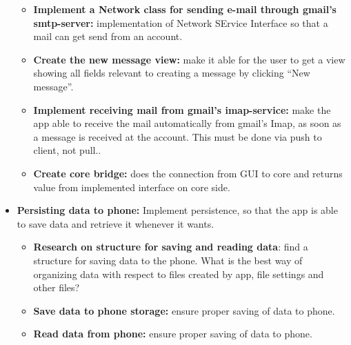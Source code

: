 \begin{itemize}
\begin{itemize}
\item{}\textbf{Implement a Network class for sending e-mail through gmail’s smtp-server:} implementation of Network SErvice Interface so that a mail can get send from an account.
\item{}\textbf{Create the new message view:} make it able for the user to get a view showing all fields relevant to creating a message by clicking “New message”.
\item{}\textbf{Implement receiving mail from gmail’s imap-service:} make the app able to receive the mail automatically from gmail’s Imap, as soon as a message is received at the account. This must be done via push to client, not pull..
\item{}\textbf{Create core bridge:} does the connection from GUI to core and returns value from implemented interface on core side.
\end{itemize}
\item{}\textbf{Persisting data to phone:} Implement persistence, so that the app is able to save data and retrieve it whenever it wants.
\begin{itemize}
\item{}\textbf{Research on structure for saving and reading data}: find a structure for saving data to the phone. What is the best way of organizing data with respect to files created by app, file settings and other files?
\item{}\textbf{Save data to phone storage:} ensure proper saving of data to phone.
\item{}\textbf{Read data from phone:} ensure proper saving of data to phone.
\end{itemize}
\end{itemize}

